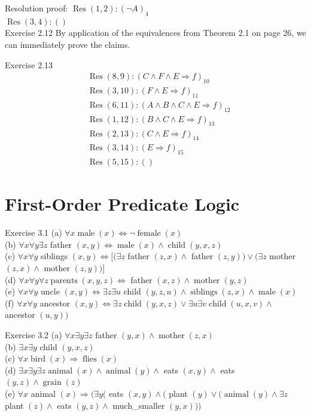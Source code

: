 \documentclass[10pt]{book}
\begin{document}
Resolution proof: $\operatorname{Res}(1,2):(\neg A)_{4}$\\
$\operatorname{Res}(3,4):()$\\
Exercise 2.12 By application of the equivalences from Theorem 2.1 on page 26, we can immediately prove the claims.

Exercise 2.13
$$
\begin{aligned}
& \operatorname{Res}(8,9):(C \wedge F \wedge E \Rightarrow f)_{10} \\
& \operatorname{Res}(3,10):(F \wedge E \Rightarrow f)_{11} \\
& \operatorname{Res}(6,11):(A \wedge B \wedge C \wedge E \Rightarrow f)_{12} \\
& \operatorname{Res}(1,12):(B \wedge C \wedge E \Rightarrow f)_{13} \\
& \operatorname{Res}(2,13):(C \wedge E \Rightarrow f)_{14} \\
& \operatorname{Res}(3,14):(E \Rightarrow f)_{15} \\
& \operatorname{Res}(5,15):()
\end{aligned}
$$

\section{First-Order Predicate Logic}
Exercise 3.1
(a) $\forall x \operatorname{male}(x) \Leftrightarrow \neg \operatorname{female}(x)$\\
(b) $\forall x \forall y \exists z$ father $(x, y) \Leftrightarrow \operatorname{male}(x) \wedge \operatorname{child}(y, x, z)$\\
(c) $\forall x \forall y$ siblings $(x, y) \Leftrightarrow[(\exists z$ father $(z, x) \wedge$ father $(z, y)) \vee(\exists z$ mother $(z, x) \wedge$ mother $(z, y))]$\\
(d) $\forall x \forall y \forall z \operatorname{parents}(x, y, z) \Leftrightarrow$ father $(x, z) \wedge \operatorname{mother}(y, z)$\\
(e) $\forall x \forall y$ uncle $(x, y) \Leftrightarrow \exists z \exists u$ child $(y, z, u) \wedge \operatorname{siblings}(z, x) \wedge \operatorname{male}(x)$\\
(f) $\forall x \forall y$ ancestor $(x, y) \Leftrightarrow \exists z \operatorname{child}(y, x, z) \vee \exists u \exists v \operatorname{child}(u, x, v) \wedge$ ancestor $(u, y))$

Exercise 3.2
(a) $\forall x \exists y \exists z$ father $(y, x) \wedge \operatorname{mother}(z, x)$\\
(b) $\exists x \exists y$ child $(y, x, z)$\\
(c) $\forall x \operatorname{bird}(x) \Rightarrow \operatorname{flies}(x)$\\
(d) $\exists x \exists y \exists z \operatorname{animal}(x) \wedge \operatorname{animal}(y) \wedge$ eats $(x, y) \wedge$ eats $(y, z) \wedge \operatorname{grain}(z)$\\
(e) $\forall x$ animal $(x) \Rightarrow(\exists y($ eats $(x, y) \wedge($ plant $(y) \vee(\operatorname{animal}(y) \wedge \exists z$ plant $(z) \wedge$ eats $(y, z) \wedge$ much\_smaller $(y, x)))$
\end{document}
